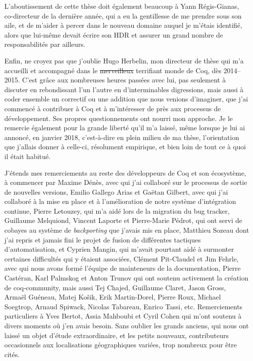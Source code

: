 L'aboutissement de cette th\`ese doit \'egalement beaucoup \`a Yann R\'egis-Gianas, co-directeur de la derni\`ere ann\'ee, qui a eu la gentillesse de me prendre sous son aile, et de m'aider \`a percer dans le nouveau domaine auquel je m'\'etais identifi\'e, alors que lui-m\^eme devait \'ecrire son HDR et assurer un grand nombre de responsabilit\'es par ailleurs.

Enfin, ne croyez pas que j'oublie Hugo Herbelin, mon directeur de th\`ese qui m'a accueilli et accompagn\'e dans le \sout{merveilleux} terrifiant monde de Coq, d\`es 2014--2015.
C'est gr\^ace aux nombreuses heures pass\'ees avec lui, pas seulement \`a discuter en rebondissant l'un l'autre en d'interminables digressions, mais aussi \`a coder ensemble un correctif ou une addition que nous venions d'imaginer, que j'ai commenc\'e \`a contribuer \`a Coq et \`a m'int\'eresser de pr\`es aux processus de d\'eveloppement.
Ses propres questionnements ont nourri mon approche.
Je le remercie \'egalement pour la grande libert\'e qu'il m'a laiss\'e, m\^eme lorsque je lui ai annonc\'e, en janvier 2018, c'est-\`a-dire en plein milieu de ma th\`ese, l'orientation que j'allais donner \`a celle-ci, r\'esolument empirique, et bien loin de tout ce \`a quoi il \'etait habitu\'e.

J'\'etends mes remerciements au reste des d\'eveloppeurs de Coq et son \'ecosyst\`eme, \`a commencer par Maxime D\'en\`es, avec qui j'ai collabor\'e sur le processus de sortie de nouvelles versions, Emilio Gallego Arias et Ga\"etan Gilbert, avec qui j'ai collabor\'e \`a la mise en place et \`a l'am\'elioration de notre syst\`eme d'int\'egration continue, Pierre Letouzey, qui m'a aid\'e lors de la migration du bug tracker, Guillaume Melquiond, Vincent Laporte et Pierre-Marie P\'edrot, qui ont servi de cobayes au syst\`eme de \emph{backporting} que j'avais mis en place, Matthieu Sozeau dont j'ai repris et jamais fini le projet de fusion de diff\'erentes tactiques d'automatisation, et Cyprien Mangin, qui m'avait pourtant aid\'e \`a surmonter certaines difficult\'es qui y \'etaient associ\'ees, Cl\'ement Pit-Claudel et Jim Fehrle, avec qui nous avons form\'e l'\'equipe de mainteneurs de la documentation, Pierre Cast\'eran, Karl Palmskog et Anton Trunov qui ont soutenu activement la cr\'eation de coq-community, mais aussi Tej Chajed, Guillaume Claret, Jason Gross, Arma\"el Gu\'eneau, Matej Ko\v{s}ik, Erik Martin-Dorel, Pierre Roux, Michael Soegtrop, Arnaud Spiwack, Nicolas Tabareau, Enrico Tassi, etc.
Remerciements particuliers \`a Yves Bertot, Assia Mahboubi et Cyril Cohen qui m'ont soutenu \`a divers moments o\`u j'en avais besoin.
Sans oublier les grands anciens, qui nous ont laiss\'e un objet d'\'etude extraordinaire, et les petits nouveaux, contributeurs occasionnels aux localisations g\'eographiques vari\'ees, trop nombreux pour \^etre cit\'es.

